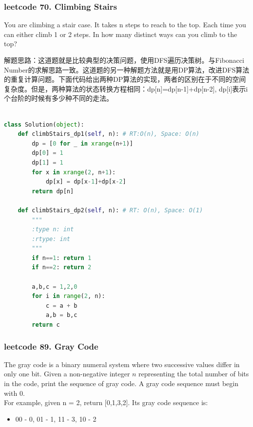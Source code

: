 \documentclass[a4paper,10pt]{article}
\begin{document}
\subsubsection{leetcode 70. Climbing Stairs}

You are climbing a stair case. It takes n steps to reach to the top. Each time you can either climb 1 or 2 steps. In how many distinct ways can you climb to the top?\\

\begin{CJK*}{UTF8}{gbsn}
\noindent 解题思路：这道题就是比较典型的决策问题，使用DFS遍历决策树。与Fibonacci Number的求解思路一致。这道题的另一种解题方法就是用DP算法，改进DFS算法的重复计算问题。下面代码给出两种DP算法的实现，两者的区别在于不同的空间复杂度。但是，两种算法的状态转换方程相同：dp[n]=dp[n-1]+dp[n-2], dp[i]表示i个台阶的时候有多少种不同的走法。\\
\end{CJK*}

\begin{lstlisting}[language=Python, caption=Problem70. Climbing Stairs]

class Solution(object):
    def climbStairs_dp1(self, n): # RT:O(n), Space: O(n)
        dp = [0 for _ in xrange(n+1)]
        dp[0] = 1
        dp[1] = 1
        for x in xrange(2, n+1):
            dp[x] = dp[x-1]+dp[x-2]
        return dp[n]
        
    def climbStairs_dp2(self, n): # RT: O(n), Space: O(1)
        """
        :type n: int
        :rtype: int
        """
        if n==1: return 1
        if n==2: return 2

        a,b,c = 1,2,0
        for i in range(2, n):
            c = a + b
            a,b = b,c
        return c
\end{lstlisting}



\subsubsection{leetcode 89. Gray Code}
The gray code is a binary numeral system where two successive values differ in only one bit. Given a non-negative integer $n$ representing the total number of bits in the code, print the sequence of gray code. A gray code sequence must begin with 0. \\

\noindent For example, given n = 2, return [0,1,3,2]. Its gray code sequence is:
\begin{itemize}
    \item 00 - 0, 01 - 1, 11 - 3, 10 - 2
\end{itemize}
\end{document}
